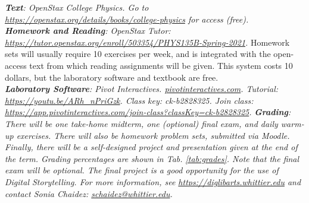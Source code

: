 \documentclass[10pt]{article}
\begin{document}
\textit{\textbf{Text}: OpenStax \textit{College Physics}. Go to \url{https://openstax.org/details/books/college-physics} for access (free).} \\
\textit{\textbf{Homework and Reading}: OpenStax Tutor: \url{https://tutor.openstax.org/enroll/503354/PHYS135B-Spring-2021}.} Homework sets will usually require 10 exercises per week, and is integrated with the open-access text from which reading assignments will be given. This system costs 10 dollars, but the laboratory software and textbook are free. \\
\textit{\textbf{Laboratory Software}: Pivot Interactives. \url{pivotinteractives.com}.  Tutorial: \url{https://youtu.be/ARh_nPriGzk}.  Class key: ck-b2828325.  Join class: \url{https://app.pivotinteractives.com/join-class?classKey=ck-b2828325}.}
\textit{\textbf{Grading}: There will be one take-home midterm, one (optional) final exam, and daily warm-up exercises.  There will also be homework problem sets, submitted via Moodle.  Finally, there will be a self-designed project and presentation given at the end of the term.  Grading percentages are shown in Tab. \ref{tab:grades}.  \textit{Note that the final exam will be optional.} The final project is a good opportunity for the use of Digital Storytelling.  For more information, see \url{https://diglibarts.whittier.edu} and contact Sonia Chaidez: \url{schaidez@whittier.edu}. } \\
\end{document}

